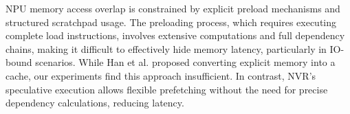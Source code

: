NPU memory access overlap is constrained by explicit preload mechanisms and structured scratchpad usage. The preloading process, which requires executing complete load instructions, involves extensive computations and full dependency chains, making it difficult to effectively hide memory latency, particularly in IO-bound scenarios.
While Han et al.\cite{lin2021pointacc} proposed converting explicit memory into a cache, our experiments find this approach insufficient. 
In contrast, NVR’s speculative execution allows flexible prefetching without the need for precise dependency calculations, reducing latency.




\vspace{-5pt}

